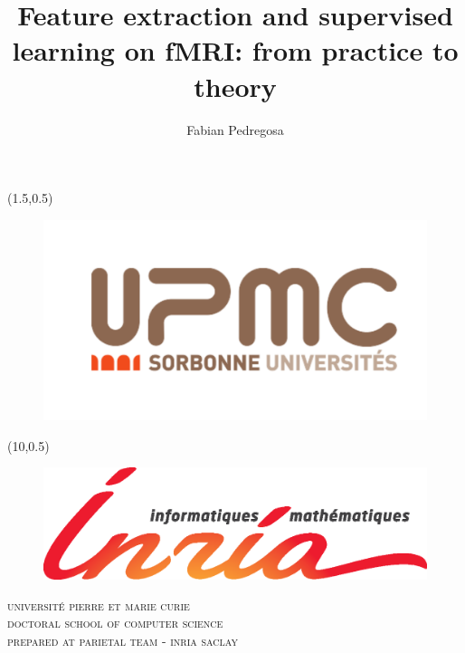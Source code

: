 \documentclass[nobib, a4paper, notoc, twoside, justified]{tufte-book}
\title{Feature extraction and supervised learning on fMRI: from practice to theory}
\author{Fabian Pedregosa}
\begin{document}

\begin{titlepage}
\begin{fullwidth}
\begin{center}

\begin{textblock}{4}(1.5,0.5)
\begin{figure}
\includegraphics[width=\linewidth]{figures/logo_upmc.pdf}
\end{figure}
\end{textblock}


\begin{textblock}{4.8}(10,0.5)
\begin{figure}
\includegraphics[width=\linewidth]{figures/logotheque-inriascientifiquefr.eps}
\end{figure}
\end{textblock}



\vspace*{30pt}
\textsc{{\huge université pierre et marie curie} \\
{\vspace{10pt} \LARGE doctoral school  of computer science}  \\
{\vspace{10pt}\LARGE prepared at parietal team - inria saclay} \\
}


\end{center}
\end{fullwidth}
\end{titlepage}
\end{document}
